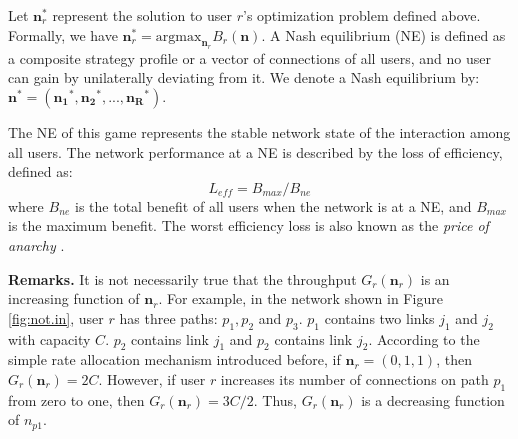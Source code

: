 \documentclass[conference]{IEEEtran}
\begin{document}
Let $\mathbf{n}^*_r$ represent the solution to user $r$'s
optimization problem defined above. Formally, we have
$\mathbf{n}^*_r = \mbox{argmax}_{\mathbf{n}_r}  B_r(\mathbf{n})$.
A Nash equilibrium (NE) is defined as a composite strategy profile
or a vector of connections of all users, and no user can gain by
unilaterally deviating from it. We denote a Nash equilibrium by:
$\mathbf{n}^*=(\mathbf{n_1}^*, \mathbf{n_2}^*, ...,
\mathbf{n_R}^*).$

The NE of this game represents the stable network state of the
interaction among all users.
The network performance at a NE is described by the loss of
efficiency, defined as:
\begin{equation}
L_{eff} = B_{max}/B_{ne} \label{eqn:leff}
\end{equation}
where $B_{ne}$ is the total benefit of all users when the network
is at a NE, and $B_{max}$ is the maximum benefit. The worst
efficiency loss is also known as the \textit{price of anarchy}
\cite{koutsoupias99worstcase}.

\bigskip
\noindent \textbf{Remarks.} It is not necessarily true that the
throughput $G_r(\mathbf{n}_r)$
is an increasing function of $\mathbf{n}_r$. For example, in the
network shown in Figure \ref{fig:not.in}, user $r$ has three
paths: $p_1, p_2$ and $p_3$. $p_1$ contains two links $j_1$ and
$j_2$ with capacity $C$. $p_2$ contains link $j_1$ and $p_2$
contains link $j_2$. According to the simple rate allocation
mechanism introduced before, if $\mathbf{n}_r=(0,1,1)$, then
$G_r(\mathbf{n}_r)=2C$. However, if user $r$ increases its number
of connections on path $p_1$ from zero to one, then
$G_r(\mathbf{n}_r)=3C/2$. Thus, $G_r(\mathbf{n}_r)$ is a
decreasing function of $n_{p1}$.
\end{document}
